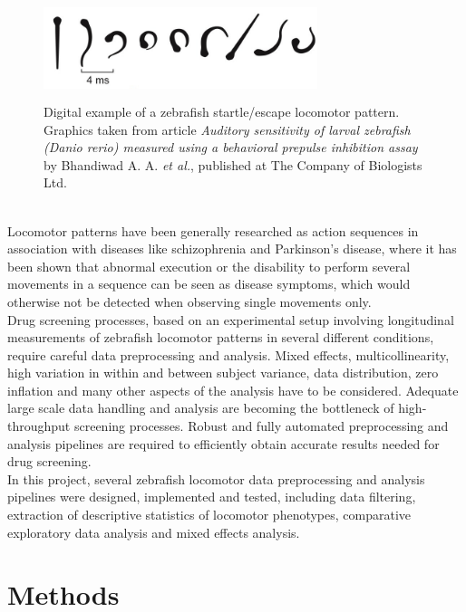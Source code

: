 \documentclass[a4paper,12pt]{article}
\begin{document}
\begin{figure}[h!]
\begin{center}
\includegraphics[width=8cm,height=3cm]{ZEBRAFISH_C_ESCAPE.jpg}
\caption{Digital example of a zebrafish startle/escape locomotor pattern. Graphics taken from article \textit{Auditory sensitivity of larval zebrafish (Danio rerio) measured using a behavioral prepulse inhibition assay} by Bhandiwad A. A. \textit{et al.}, published at  The Company of Biologists Ltd\cite{ref21}. }
\end{center}
\end{figure}
\\
Locomotor patterns have been generally researched as action sequences\cite{ref22} in association with diseases like schizophrenia\cite{ref23} and Parkinson’s disease\cite{ref24}, where it has been shown that abnormal execution or the disability to perform several movements in a sequence can be seen as disease symptoms, which would otherwise not be detected when observing single movements only.\\
Drug screening processes, based on an experimental setup involving longitudinal measurements of zebrafish locomotor patterns in several different conditions, require careful data preprocessing and analysis\cite{ref25}\cite{ref26}. Mixed effects, multicollinearity, high variation in within and between subject variance, data distribution, zero inflation and many other aspects of the analysis have to be considered. Adequate large scale data handling and analysis are becoming the bottleneck of high-throughput screening processes. Robust and fully automated preprocessing and analysis pipelines are required to efficiently obtain accurate results needed for drug screening.
\\In this project, several zebrafish locomotor data preprocessing and analysis pipelines were designed, implemented and tested, including data filtering, extraction of descriptive statistics of locomotor phenotypes, comparative exploratory data analysis and mixed effects analysis.
\section{Methods}
\end{document}
